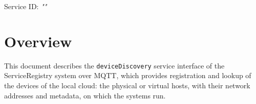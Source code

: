 \documentclass[a4paper]{arrowhead}
\begin{document}
\sloppy

\ArrowheadSetup

\begin{center}
  \vspace*{1cm}
  \huge{\arrowtitle}

  \vspace*{0.2cm}
  \LARGE{\arrowtype}
  \vspace*{1cm}

  \Large{Service ID: \textit{"\arrowid"}}

  \vspace*{\fill}


  \vspace*{1cm}
  \vspace*{\fill}

  \begin{abstract}
    This document describes the MQTT protocol with TLS payload security and JSON payload encoding variant of the \texttt{deviceDiscovery} service of the ServiceRegistry system.
  \end{abstract}

  \vspace*{1cm}
\end{center}

\newpage

\tableofcontents
\newpage

\section{Overview}
\label{sec:overview}

This document describes the \texttt{deviceDiscovery} service interface of the ServiceRegistry system over MQTT, which provides registration and lookup of the devices of the local cloud: the physical or virtual hosts, with their network addresses and metadata, on which the systems run.
\end{document}
